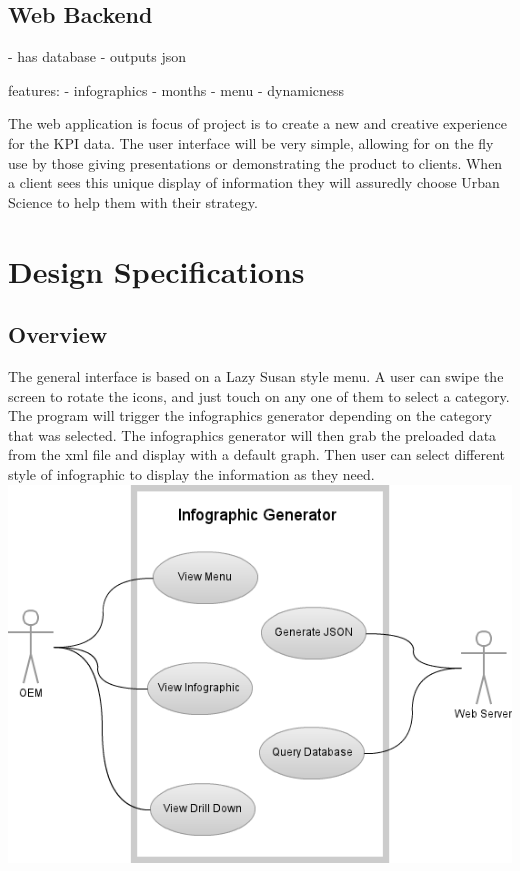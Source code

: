 \documentclass[11pt,a4paper,oneside]{article}
\begin{document}
\subsection {Web Backend}
 - has database
 - outputs json



features: 
   - infographics
   - months
   - menu
   - dynamicness


The web application is focus of project is to create a new and creative experience for the KPI data. The user interface will be very simple, allowing for on the fly use by those giving presentations or demonstrating the product to clients. When a client sees this unique display of information they will assuredly choose Urban Science to help them with their strategy.\\



\newpage

\section{Design Specifications}

\subsection{Overview}

The general interface is based on a Lazy Susan style menu. A user can swipe the screen to rotate the icons, and just touch on any one of them to select a category. The program will trigger the infographics generator depending on the category that was selected. The infographics generator will then grab the preloaded data from the xml file and display with a default graph. Then user can select different style of infographic to display the information as they need.\\


\includegraphics[width=1\textwidth]{images/Capstone_-_Use_Case_Diagram.png}\\   
\end{document}
